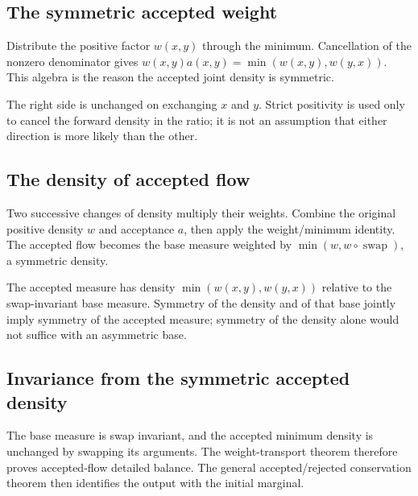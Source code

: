\documentclass[11pt,a4paper]{report}
\begin{document}
\subsection{\texorpdfstring{The symmetric accepted weight}{The symmetric accepted weight}}
\label{report-step-UnadjustedLangevin-Metropolis-lean-10}


Distribute the positive factor \(w(x,y)\) through the minimum. Cancellation of the nonzero denominator gives \(w(x,y)a(x,y)=\min(w(x,y),w(y,x))\). This algebra is the reason the accepted joint density is symmetric.



The right side is unchanged on exchanging \(x\) and \(y\). Strict positivity is used only to cancel the forward density in the ratio; it is not an assumption that either direction is more likely than the other.

\subsection{\texorpdfstring{The density of accepted flow}{The density of accepted flow}}
\label{report-step-UnadjustedLangevin-Metropolis-lean-11}


Two successive changes of density multiply their weights. Combine the original positive density \(w\) and acceptance \(a\), then apply the weight/\allowbreak{}minimum identity. The accepted flow becomes the base measure weighted by \(\min(w,w\circ\operatorname{swap})\), a symmetric density.



The accepted measure has density \(\min(w(x,y),w(y,x))\) relative to the swap-invariant base measure. Symmetry of the density and of that base jointly imply symmetry of the accepted measure; symmetry of the density alone would not suffice with an asymmetric base.

\subsection{\texorpdfstring{Invariance from the symmetric accepted density}{Invariance from the symmetric accepted density}}
\label{report-step-UnadjustedLangevin-Metropolis-lean-12}


The base measure is swap invariant, and the accepted minimum density is unchanged by swapping its arguments. The weight-transport theorem therefore proves accepted-flow detailed balance. The general accepted/\allowbreak{}rejected conservation theorem then identifies the output with the initial marginal.
\end{document}

